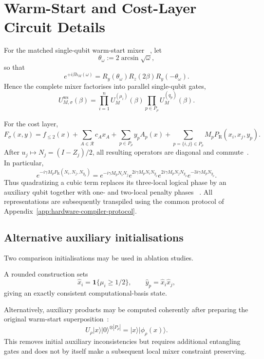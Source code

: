 \documentclass[a4paper,onecolumn,11pt,unpublished]{quantumarticle}
\theoremstyle{remark}
\begin{document}
\section{Warm-Start and Cost-Layer Circuit Details}
\label{app:warm-start-circuits}

For the matched single-qubit warm-start mixer
~\cite{Egger2021,TateCustom2023}, let
\[
\theta_\omega:=2\arcsin\sqrt{\omega},
\]
so that
\[
e^{+i\beta h_M(\omega)}
=
R_y(\theta_\omega)
R_z(2\beta)
R_y(-\theta_\omega).
\]
Hence the complete mixer factorises into parallel single-qubit gates,
\[
U_{M,\sigma}^{\mathrm{ws}}(\beta)
=
\prod_{i=1}^n U_M^{(\mu_i)}(\beta)
\prod_{p\in P_\rho}U_M^{(q_p)}(\beta).
\]

For the cost layer,
\[
F_\sigma(x,y)
=
f_{\le2}(x)
+\sum_{A\in\mathcal R}c_Ax_A
+\sum_{p\in P_\rho}y_pA_p(x)
+\sum_{p=\{i,j\}\in P_\rho}
M_pP_{\mathrm R}(x_i,x_j,y_p).
\]
After $u_j\mapsto N_j=(I-Z_j)/2$, all resulting operators are diagonal and
commute~\cite{Hadfield2021,CampbellDahl2022}.  In particular,
\[
e^{-i\gamma M_p P_{\mathrm R}(N_i,N_j,N_{y_p})}
=
e^{-i\gamma M_pN_iN_j}
e^{2i\gamma M_pN_iN_{y_p}}
e^{2i\gamma M_pN_jN_{y_p}}
e^{-3i\gamma M_pN_{y_p}}.
\]
Thus quadratizing a cubic term replaces its three-local logical phase by an
auxiliary qubit together with one- and two-local penalty phases
~\cite{Schmidbauer2024,Schmidbauer2026}.  All
representations are subsequently transpiled using the common protocol of
Appendix~\ref{app:hardware-compiler-protocol}.



\subsection{Alternative auxiliary initialisations}
\label{app:alternative-warm-starts}

Two comparison initialisations may be used in ablation studies.

A rounded construction sets
\[
\hat x_i=\mathbf 1\{\mu_i\ge 1/2\},
\qquad
\hat y_p=\hat x_i\hat x_j,
\]
giving an exactly consistent computational-basis state.

Alternatively, auxiliary products may be computed coherently after preparing
the original warm-start superposition~\cite{Egger2021}:
\[
U_\rho
|x\rangle|0\rangle^{\otimes |P_\rho|}
=
|x\rangle|\phi_\rho(x)\rangle .
\]
This removes initial auxiliary inconsistencies but requires additional
entangling gates and does not by itself make a subsequent local mixer
constraint preserving.
\end{document}
